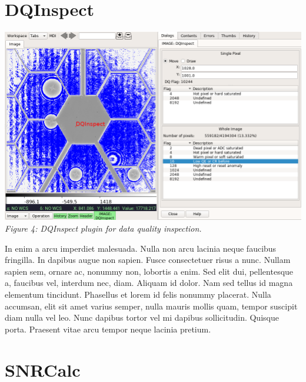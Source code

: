 \documentclass[]{article}
\begin{document}
\begin{multicols}{3}
\section*{DQInspect}

\para
\begin{center}
\includegraphics[width=8in]{plugin_dqinspect} \\
\vspace*{0.4em}
\label{fig:plugin_dqinspect}
{\small\em Figure 4: DQInspect plugin for data quality inspection.}
\end{center}

\para
In enim a arcu imperdiet malesuada. Nulla non arcu lacinia neque
faucibus fringilla. In dapibus augue non sapien. Fusce consectetuer
risus a nunc. Nullam sapien sem, ornare ac, nonummy non, lobortis a
enim. Sed elit dui, pellentesque a, faucibus vel, interdum nec,
diam. Aliquam id dolor. Nam sed tellus id magna elementum
tincidunt. Phasellus et lorem id felis nonummy placerat. Nulla accumsan,
elit sit amet varius semper, nulla mauris mollis quam, tempor suscipit
diam nulla vel leo. Nunc dapibus tortor vel mi dapibus
sollicitudin. Quisque porta. Praesent vitae arcu tempor neque lacinia
pretium.

\section*{SNRCalc}


\end{multicols}
\end{document}
